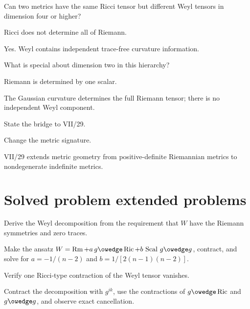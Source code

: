 \begin{exercise}\label{exr:vii28-22}
Can two metrics have the same Ricci tensor but different Weyl tensors in dimension four or higher?
\end{exercise}
\begin{hint}
Ricci does not determine all of Riemann.
\end{hint}
\begin{solution}
Yes. Weyl contains independent trace-free curvature information.
\end{solution}

\begin{exercise}\label{exr:vii28-23}
What is special about dimension two in this hierarchy?
\end{exercise}
\begin{hint}
Riemann is determined by one scalar.
\end{hint}
\begin{solution}
The Gaussian curvature determines the full Riemann tensor; there is no independent Weyl component.
\end{solution}

\begin{exercise}\label{exr:vii28-24}
State the bridge to VII/29.
\end{exercise}
\begin{hint}
Change the metric signature.
\end{hint}
\begin{solution}
VII/29 extends metric geometry from positive-definite Riemannian metrics to nondegenerate indefinite metrics.
\end{solution}

\section{Solved problem extended problems}
\begin{problem}\label{prob:vii28-01}
Derive the Weyl decomposition from the requirement that \(W\) have the Riemann symmetries and zero traces.
\end{problem}
\begin{solution}
Make the ansatz \(W=\operatorname{Rm}+a\,g\owedge\operatorname{Ric}+b\,\operatorname{Scal}\,g\owedge g\), contract, and solve for \(a=-1/(n-2)\) and \(b=1/[2(n-1)(n-2)]\).
\end{solution}

\begin{problem}\label{prob:vii28-02}
Verify one Ricci-type contraction of the Weyl tensor vanishes.
\end{problem}
\begin{solution}
Contract the decomposition with \(g^{ik}\), use the contractions of \(g\owedge\operatorname{Ric}\) and \(g\owedge g\), and observe exact cancellation.
\end{solution}

